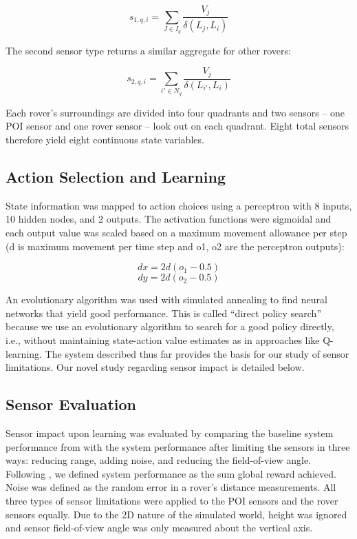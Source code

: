 \documentclass[letterpaper, 10 pt, conference]{ieeeconf}  %
\begin{document}
\[
s_{1,q,i} =  \sum_{J \in I_q}  \frac{V_j}{\delta (L_j, L_i)} 
\]

The second sensor type returns a similar aggregate for other rovers:

\[
s_{2,q,i} =  \sum_{i' \in N_q}  \frac{V_j}{\delta (L_{i'}, L_i)}  
\]

Each rover’s surroundings are divided into four quadrants and two
sensors -- one POI sensor and one rover sensor -- look out on each
quadrant. Eight total sensors therefore yield eight continuous state
variables.

\subsection{Action Selection and Learning}
State information was mapped to action choices using a perceptron with
8 inputs, 10 hidden nodes, and 2 outputs. The activation functions
were sigmoidal and each output value was scaled based on a maximum
movement allowance per step (d is maximum movement per time step and
o1, o2 are the perceptron outputs):

\[
dx = 2d(o_1-0.5)
\]
\[
dy = 2d(o_2-0.5)
\]

An evolutionary algorithm was used with simulated annealing to find
neural networks that yield good performance. This is called “direct
policy search” because we use an evolutionary algorithm to search for
a good policy directly, i.e., without maintaining state-action value
estimates as in approaches like Q-learning. The system described thus
far provides the basis for our study of sensor limitations. Our novel
study regarding sensor impact is detailed below.

\subsection{Sensor Evaluation}
Sensor impact upon learning was evaluated by comparing the baseline
system performance from \cite{agogino2008analyzing} with the system performance after limiting
the sensors in three ways: reducing range, adding noise, and reducing
the field-of-view angle.  Following \cite{agogino2008analyzing}, we defined system performance
as the sum global reward achieved.  Noise was defined as the random
error in a rover’s distance measurements. All three types of sensor
limitations were applied to the POI sensors and the rover sensors
equally. Due to the 2D nature of the simulated world, height was
ignored and sensor field-of-view angle was only measured about the
vertical axis.
\end{document}
